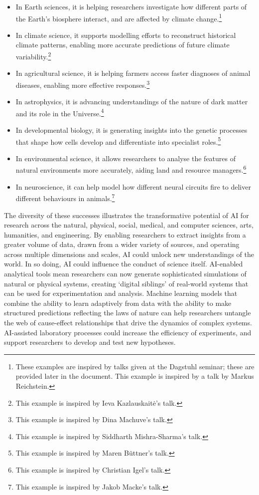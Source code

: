 \begin{itemize}
\item
  In Earth sciences, it is helping researchers investigate how different
  parts of the Earth's biosphere interact, and are affected by climate
  change.\footnote{These examples are inspired by talks given at the
    Dagstuhl seminar; these are provided later in the document. This
    example is inspired by a talk by Markus Reichstein.}
\item
  In climate science, it supports modelling efforts to reconstruct
  historical climate patterns, enabling more accurate predictions of
  future climate variability.\footnote{This example is inspired by Ieva
    Kazlauskaitė's talk.}
\item
  In agricultural science, it is helping farmers access faster diagnoses
  of animal diseases, enabling more effective responses.\footnote{This
    example is inspired by Dina Machuve's talk.}
\item
  In astrophysics, it is advancing understandings of the nature of dark
  matter and its role in the Universe.\footnote{This example is inspired
    by Siddharth Mishra-Sharma's talk.}
\item
  In developmental biology, it is generating insights into the genetic
  processes that shape how cells develop and differentiate into
  specialist roles.\footnote{This example is inspired by Maren Büttner's
    talk.}
\item
  In environmental science, it allows researchers to analyse the
  features of natural environments more accurately, aiding land and
  resource managers.\footnote{This example is inspired by Christian
    Igel's talk.}
\item
  In neuroscience, it can help model how different neural circuits fire
  to deliver different behaviours in animals.\footnote{This example is
    inspired by Jakob Macke's talk.}
\end{itemize}

The diversity of these successes illustrates the transformative
potential of AI for research across the natural, physical, social,
medical, and computer sciences, arts, humanities, and engineering. By
enabling researchers to extract insights from a greater volume of data,
drawn from a wider variety of sources, and operating across multiple
dimensions and scales, AI could unlock new understandings of the world.
In so doing, AI could influence the conduct of science itself.
AI-enabled analytical tools mean researchers can now generate
sophisticated simulations of natural or physical systems, creating
`digital siblings' of real-world systems that can be used for
experimentation and analysis. Machine learning models that combine the
ability to learn adaptively from data with the ability to make
structured predictions reflecting the laws of nature can help
researchers untangle the web of cause-effect relationships that drive
the dynamics of complex systems. AI-assisted laboratory processes could
increase the efficiency of experiments, and support researchers to
develop and test new hypotheses.


